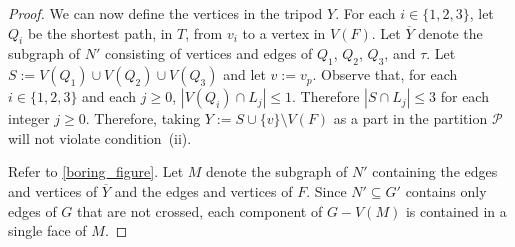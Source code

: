 \documentclass{patmorin}
\DeclareMathOperator{\dist}{dist}
\newcommand{\PP}{\mathcal{P}}
\renewcommand{\ge}{\geqslant}
\renewcommand{\le}{\leqslant}
\begin{document}
\begin{proof}

  We can now define the vertices in the tripod $Y$.  For each $i\in\{1,2,3\}$, let $Q_i$ be the shortest path, in $T$, from $v_i$ to a vertex in $V(F)$.  Let $\overline{Y}$ denote the subgraph of $N'$ consisting of vertices and edges of $Q_1$, $Q_2$, $Q_3$, and $\tau$.  Let $S:=V(Q_1)\cup V(Q_2)\cup V(Q_3)$ and let $v:=v_p$.  Observe that, for each $i\in\{1,2,3\}$ and each $j\ge 0$, $|V(Q_i)\cap L_j|\le 1$.  Therefore $|S\cap L_j|\le 3$ for each integer $j\ge 0$.  Therefore, taking $Y:=S\cup\{v\}\setminus V(F)$ as a part in the partition $\PP$ will not violate condition~(ii).


  Refer to \cref{boring_figure}.  Let $M$ denote the subgraph of $N'$ containing the edges and vertices of $\overline{Y}$ and the edges and vertices of $F$.  Since $N'\subseteq G'$ contains only edges of $G$ that are not crossed, each component of $G-V(M)$ is contained in a single face of $M$.


\end{proof}
\end{document}
